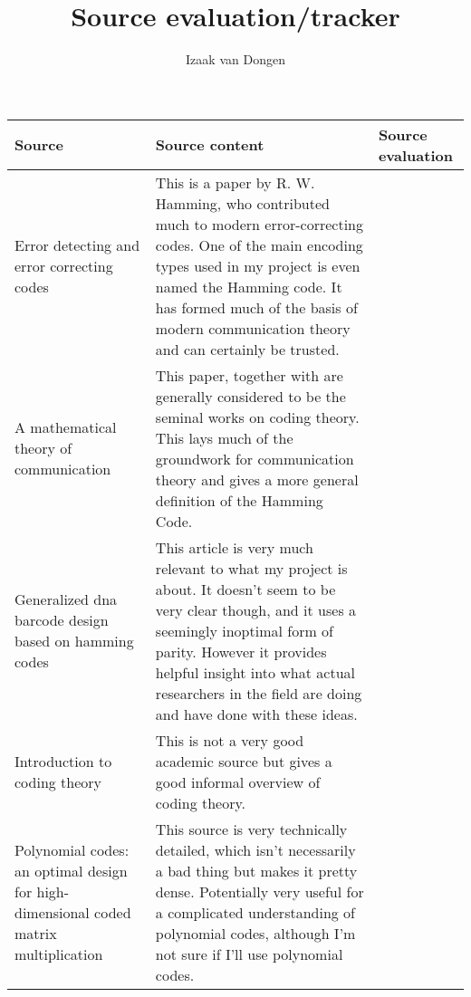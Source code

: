 \documentclass{article}
\title{Source evaluation/tracker}
\author{Izaak van Dongen}
\begin{document}
    \maketitle

    {
    \renewcommand{\arraystretch}{2.0}
    \begin{center}
    \begin{longtable}{p{5cm} p{5cm} p{5cm}} \toprule
    Source & Source content & Source evaluation \\ \midrule

    Error detecting and error correcting codes \citep*{Codes1950Hamming} &

    This is a paper by R. W. Hamming, who contributed much to modern
    error-correcting codes. One of the main encoding types used in my project
    is even named the Hamming code. It has formed much of the basis of modern
    communication theory and can certainly be trusted. \\

    A mathematical theory of communication \citep*{Communication1948Shannon} & 

    This paper, together with \citep*{Codes1950Hamming} are generally considered
    to be the seminal works on coding theory. This lays much of the groundwork
    for communication theory and gives a more general definition of the Hamming
    Code. \\

    Generalized dna barcode design based on hamming codes \citep*{HammingBarcodes2012BystrykhLeonid} &

    This article is very much relevant to what my project is about. It doesn't
    seem to be very clear though, and it uses a seemingly inoptimal form of
    parity. However it provides helpful insight into what actual researchers in
    the field are doing and have done with these ideas. \\

    Introduction to coding theory \citep*{CodeIntro2010Guruswami} &

    This is not a very good academic source but gives a good informal overview
    of coding theory. \\

    Polynomial codes: an optimal design for high-dimensional coded matrix multiplication \citep*{PolynomialCodes2017MaddahAvestimehr} &

    This source is very technically detailed, which isn't necessarily a bad
    thing but makes it pretty dense. Potentially very useful for a complicated
    understanding of polynomial codes, although I'm not sure if I'll use
    polynomial codes. \\


\end{longtable}
\end{center}}
\end{document}
